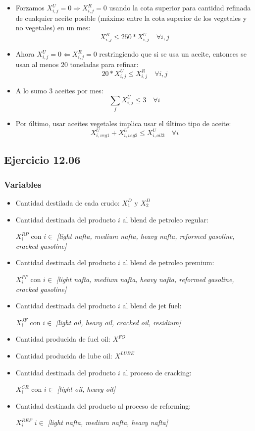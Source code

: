 \begin{itemize}
    \item Forzamos $X^U_{i,j} = 0 \Rightarrow X^R_{i,j} = 0$ usando la cota superior para cantidad refinada de cualquier aceite posible (máximo entre la cota superior de los vegetales y no vegetales) en un mes:
    $$ X^R_{i,j} \leq 250 * X^U_{i,j} \quad \forall i,j $$

    \item Ahora $X^U_{i,j} = 0 \Leftarrow X^R_{i,j} = 0$ restringiendo que si se usa un aceite, entonces se usan al menos 20 toneladas para refinar:
    $$ 20*X^U_{i,j} \leq X^R_{i,j}  \quad \forall i,j $$

    \item A lo sumo 3 aceites por mes:
    $$ \sum_{j} X^U_{i,j} \leq 3 \quad \forall i $$

    \item Por último, usar aceites vegetales implica usar el último tipo de aceite:
    $$ X^U_{i,veg1} + X^U_{i,veg2} \leq X^U_{i,oil3}  \quad \forall i$$
\end{itemize}


\subsection{Ejercicio 12.06}
\subsubsection{Variables}

\begin{itemize}
    \item Cantidad destilada de cada crudo: $X^D_1$ y $X^D_2$
    \item Cantidad destinada del producto $i$ al blend de petroleo regular:

    $X^{RP}_i$ con $i \in$ \emph{[light nafta, medium nafta, heavy nafta, reformed gasoline, cracked gasoline]}
    \item Cantidad destinada del producto $i$ al blend de petroleo premium:

    $X^{PP}_i$ con $i \in$ \emph{[light nafta, medium nafta, heavy nafta, reformed gasoline, cracked gasoline]}
    \item Cantidad destinada del producto $i$ al blend de jet fuel:

    $X^{JF}_i$ con $i \in$ \emph{[light oil, heavy oil, cracked oil, residium]}
    \item Cantidad producida de fuel oil: $X^{FO}$
    \item Cantidad producida de lube oil: $X^{LUBE}$
    \item Cantidad destinada del producto $i$ al proceso de cracking:

    $X^{CR}_i$ con $i \in$ \emph{[light oil, heavy oil]}
    \item Cantidad destinada del producto al proceso de reforming:

    $X^{REF}_{i}$ $i \in$ \emph{[light nafta, medium nafta, heavy nafta]}
\end{itemize}


